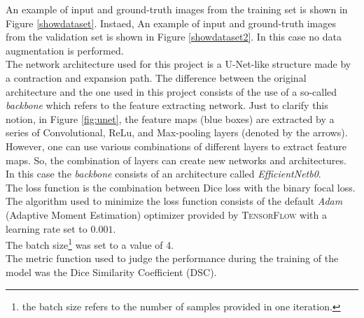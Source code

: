 \documentclass{standalone}
\begin{document}
An example of input and ground-truth images from the training set is shown in Figure \ref{showdataset}.
Instaed, An example of input and ground-truth images from the validation set is shown in Figure \ref{showdataset2}.
In this case no data augmentation is performed.
\\
The network architecture used for this project is a U-Net-like structure made by a contraction and expansion path.
The difference between the original architecture and the one used in this project consists of the use of a so-called \textit{backbone} which refers to the feature extracting network.
Just to clarify this notion, in Figure \ref{fig:unet}, the feature maps (blue boxes) are extracted by a series of Convolutional, ReLu, and Max-pooling layers (denoted by the arrows).
However, one can use various combinations of different layers to extract feature maps. 
So, the combination of layers can create new networks and architectures.
In this case the \textit{backbone} consists of an architecture called \textit{EfficientNetb0}\cite{EfficientNet}.
\\
The loss function is the combination between Dice loss with the binary focal loss.
\\
The algorithm used to minimize the loss function consists of the default \textit{Adam} (Adaptive Moment Estimation) optimizer provided by \textsc{TensorFlow} with a learning rate set to $0.001$.
\\
The batch size\footnote{the batch size refers to the number of samples provided in one iteration.} was set to a value of 4.
\\
The metric function used to judge the performance during the training of the model was the Dice Similarity Coefficient (DSC).
\end{document}

